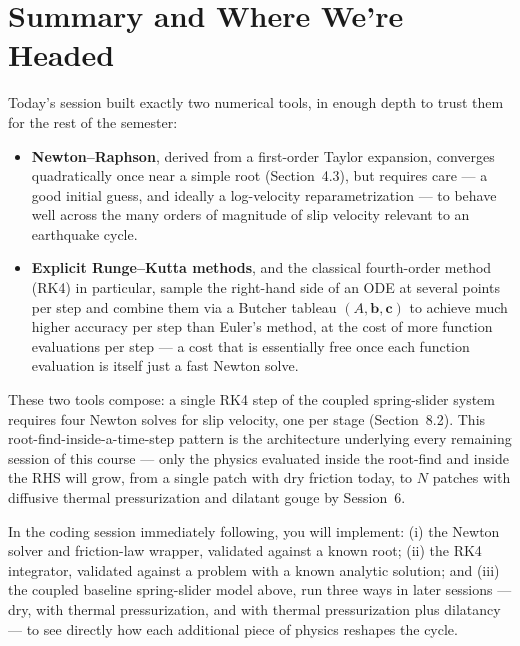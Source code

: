 \section{Summary and Where We're Headed}

Today's session built exactly two numerical tools, in enough depth to trust them for the rest of the semester:

\begin{itemize}
\item \textbf{Newton--Raphson}, derived from a first-order Taylor expansion, converges quadratically once near a simple root (Section~4.3), but requires care --- a good initial guess, and ideally a log-velocity reparametrization --- to behave well across the many orders of magnitude of slip velocity relevant to an earthquake cycle.
\item \textbf{Explicit Runge--Kutta methods}, and the classical fourth-order method (RK4) in particular, sample the right-hand side of an ODE at several points per step and combine them via a Butcher tableau $(A,\mathbf b,\mathbf c)$ to achieve much higher accuracy per step than Euler's method, at the cost of more function evaluations per step --- a cost that is essentially free once each function evaluation is itself just a fast Newton solve.
\end{itemize}

These two tools compose: a single RK4 step of the coupled spring-slider system requires four Newton solves for slip velocity, one per stage (Section~8.2). This root-find-inside-a-time-step pattern is the architecture underlying every remaining session of this course --- only the physics evaluated inside the root-find and inside the RHS will grow, from a single patch with dry friction today, to $N$ patches with diffusive thermal pressurization and dilatant gouge by Session~6.

In the coding session immediately following, you will implement: (i) the Newton solver and friction-law wrapper, validated against a known root; (ii) the RK4 integrator, validated against a problem with a known analytic solution; and (iii) the coupled baseline spring-slider model above, run three ways in later sessions --- dry, with thermal pressurization, and with thermal pressurization plus dilatancy --- to see directly how each additional piece of physics reshapes the cycle.

